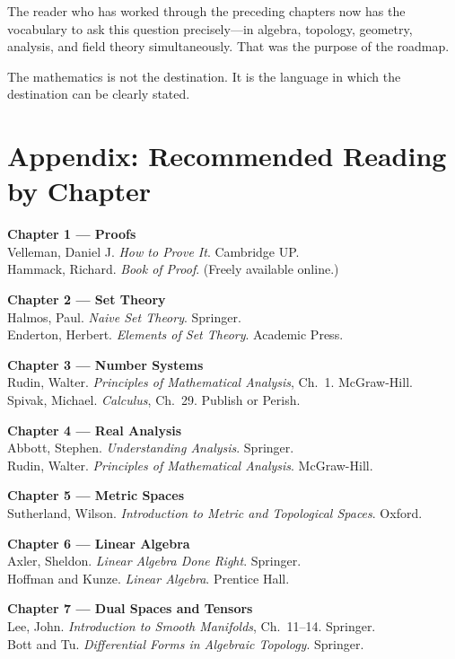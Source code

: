 \documentclass[12pt, twoside, openright, a4paper]{book}
\begin{document}
The reader who has worked through the preceding chapters now has the vocabulary to ask this question precisely---in algebra, topology, geometry, analysis, and field theory simultaneously. That was the purpose of the roadmap.

The mathematics is not the destination. It is the language in which the destination can be clearly stated.


\backmatter

\chapter*{Appendix: Recommended Reading by Chapter}

\noindent\textbf{Chapter 1 --- Proofs}\\
Velleman, Daniel J. \textit{How to Prove It}. Cambridge UP.\\
Hammack, Richard. \textit{Book of Proof}. (Freely available online.)

\medskip\noindent\textbf{Chapter 2 --- Set Theory}\\
Halmos, Paul. \textit{Naive Set Theory}. Springer.\\
Enderton, Herbert. \textit{Elements of Set Theory}. Academic Press.

\medskip\noindent\textbf{Chapter 3 --- Number Systems}\\
Rudin, Walter. \textit{Principles of Mathematical Analysis}, Ch.\ 1. McGraw-Hill.\\
Spivak, Michael. \textit{Calculus}, Ch.\ 29. Publish or Perish.

\medskip\noindent\textbf{Chapter 4 --- Real Analysis}\\
Abbott, Stephen. \textit{Understanding Analysis}. Springer.\\
Rudin, Walter. \textit{Principles of Mathematical Analysis}. McGraw-Hill.

\medskip\noindent\textbf{Chapter 5 --- Metric Spaces}\\
Sutherland, Wilson. \textit{Introduction to Metric and Topological Spaces}. Oxford.

\medskip\noindent\textbf{Chapter 6 --- Linear Algebra}\\
Axler, Sheldon. \textit{Linear Algebra Done Right}. Springer.\\
Hoffman and Kunze. \textit{Linear Algebra}. Prentice Hall.

\medskip\noindent\textbf{Chapter 7 --- Dual Spaces and Tensors}\\
Lee, John. \textit{Introduction to Smooth Manifolds}, Ch.\ 11--14. Springer.\\
Bott and Tu. \textit{Differential Forms in Algebraic Topology}. Springer.
\end{document}
